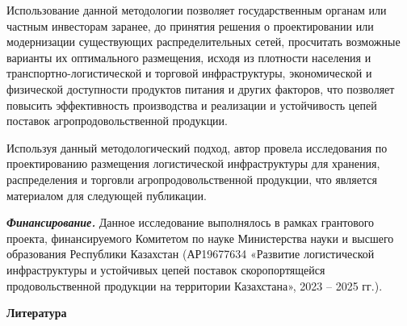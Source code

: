 \begin{multicols}{2}
Использование данной методологии позволяет государственным органам или
частным инвесторам заранее, до принятия решения о проектировании или
модернизации существующих распределительных сетей, просчитать возможные
варианты их оптимального размещения, исходя из плотности населения и
транспортно-логистической и торговой инфраструктуры, экономической и
физической доступности продуктов питания и других факторов, что
позволяет повысить эффективность производства и реализации и
устойчивость цепей поставок агропродовольственной продукции.

Используя данный методологический подход, автор провела исследования по
проектированию размещения логистической инфраструктуры для хранения,
распределения и торговли агропродовольственной продукции, что является
материалом для следующей публикации.

\emph{{\bfseries Финансирование.}} Данное исследование выполнялось в рамках
грантового проекта, финансируемого Комитетом по науке Министерства науки
и высшего образования Республики Казахстан (АР19677634 «Развитие
логистической инфраструктуры и устойчивых цепей поставок скоропортящейся
продовольственной продукции на территории Казахстана», 2023 -- 2025 гг.).
\end{multicols}

\begin{center}
{\bfseries Литература}
\end{center}

